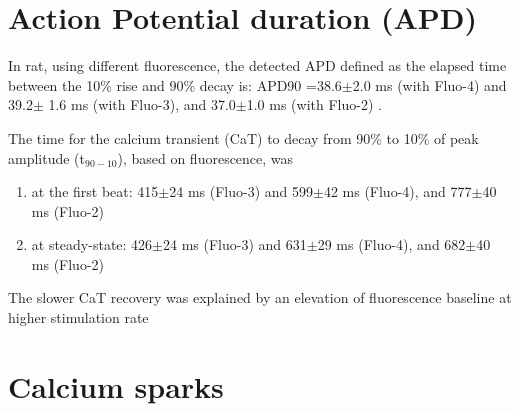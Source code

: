 \section{Action Potential duration (APD)}

In rat, using different fluorescence, the detected APD defined as the elapsed
time between the 10\% rise and 90\% decay is:
APD90 =38.6$\pm$2.0 ms (with Fluo-4) and 39.2$\pm$ 1.6 ms (with Fluo-3), and
37.0$\pm$1.0 ms (with Fluo-2) \citep{hagen2012}. 

The time for the calcium transient (CaT) to decay from 90\% to 10\% of peak
amplitude (t$_{90-10}$), based on fluorescence, was
\begin{enumerate}
  \item at the first beat: 415$\pm$24 ms (Fluo-3) and
599$\pm$42 ms (Fluo-4), and 777$\pm$40 ms (Fluo-2) 
\item at steady-state: 426$\pm$24 ms (Fluo-3) and
631$\pm$29 ms (Fluo-4), and 682$\pm$40 ms (Fluo-2)
\end{enumerate} 
The slower CaT recovery was explained by an elevation of fluorescence baseline
at higher stimulation rate

\section{Calcium sparks}



